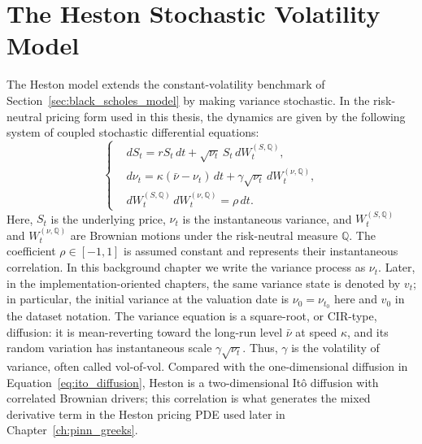 \section{The Heston Stochastic Volatility Model}
\label{sec:heston_model}

The Heston model \cite{heston} extends the constant-volatility benchmark of Section~\ref{sec:black_scholes_model} by making variance stochastic. In the risk-neutral pricing form used in this thesis, the dynamics are given by the following system of coupled stochastic differential equations:
\begin{equation}
    \label{eq:heston_dynamics}
    \left\{
    \begin{aligned}
    &dS_t = rS_t\,dt+\sqrt{\nu_t}\,S_t\,dW_t^{(S,\mathbb Q)},\\
    &d\nu_t = \kappa(\bar\nu-\nu_t)\,dt+\gamma\sqrt{\nu_t}\,dW_t^{(\nu,\mathbb Q)},\\
    &dW_t^{(S,\mathbb Q)}\,dW_t^{(\nu,\mathbb Q)}=\rho\,dt.
    \end{aligned}
    \right.
\end{equation}
Here, $S_t$ is the underlying price, $\nu_t$ is the instantaneous variance, and $W_t^{(S,\mathbb Q)}$ and $W_t^{(\nu,\mathbb Q)}$ are Brownian motions under the risk-neutral measure $\mathbb Q$. The coefficient \(\rho\in[-1,1]\) is assumed constant and represents their instantaneous correlation. In this background chapter we write the variance process as $\nu_t$. Later, in the implementation-oriented chapters, the same variance state is denoted by $v_t$; in particular, the initial variance at the valuation date is $\nu_0=\nu_{t_0}$ here and $v_0$ in the dataset notation. The variance equation is a square-root, or CIR-type, diffusion: it is mean-reverting toward the long-run level $\bar\nu$ at speed $\kappa$, and its random variation has instantaneous scale $\gamma\sqrt{\nu_t}$. Thus, $\gamma$ is the volatility of variance, often called vol-of-vol.
Compared with the one-dimensional diffusion in Equation~\eqref{eq:ito_diffusion}, Heston is a two-dimensional It\^o diffusion with correlated Brownian drivers; this correlation is what generates the mixed derivative term in the Heston pricing PDE used later in Chapter~\ref{ch:pinn_greeks}.

